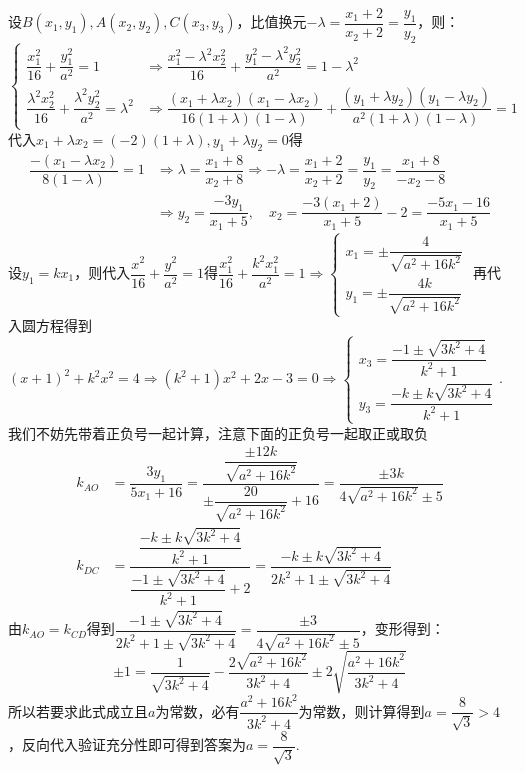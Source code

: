 \begin{solution}
    设$B(x_1,y_1),A(x_2,y_2),C(x_3,y_3)$，比值换元$-\lambda=\dfrac{x_1+2}{x_2+2}=\dfrac{y_1}{y_2}$，则：
    \[\begin{cases}\dfrac{x_1^2}{16}+\dfrac{y_1^2}{a^2}=1&\Rightarrow \dfrac{x_1^2-\lambda^2x_2^2}{16}+\dfrac{y_1^2-\lambda^2y_2^2}{a^2}=1-\lambda^2\\[1.2ex]\dfrac{\lambda^2x_2^2}{16}+\dfrac{\lambda^2y_2^2}{a^2}=\lambda^2&\Rightarrow \dfrac{(x_1+\lambda x_2)(x_1-\lambda x_2)}{16(1+\lambda)(1-\lambda)}+\dfrac{(y_1+\lambda y_2)(y_1-\lambda y_2)}{a^2(1+\lambda)(1-\lambda)}=1\end{cases}\]
    代入$x_1+\lambda x_2=(-2)(1+\lambda),y_1+\lambda y_2=0$得
    \begin{align*}\dfrac{-(x_1-\lambda x_2)}{8(1-\lambda)}=1&\Rightarrow \lambda=\dfrac{x_1+8}{x_2+8}\Rightarrow -\lambda=\dfrac{x_1+2}{x_2+2}=\dfrac{y_1}{y_2}=\dfrac{x_1+8}{-x_2-8}\\
    &\Rightarrow y_2=\dfrac{-3y_1}{x_1+5},\quad x_2=\dfrac{-3(x_1+2)}{x_1+5}-2=\dfrac{-5x_1-16}{x_1+5}
\end{align*}
设$y_1=kx_1$，则代入$\dfrac{x^2}{16}+\dfrac{y^2}{a^2}=1$得$\dfrac{x_1^2}{16}+\dfrac{k^2x_1^2}{a^2}=1\Rightarrow \begin{cases}x_1=\pm\dfrac{4}{\sqrt{a^2+16k^2}}\\[1.2ex]y_1=\pm\dfrac{4k}{\sqrt{a^2+16k^2}}\end{cases}$\newline
再代入圆方程得到$(x+1)^2+k^2x^2=4\Rightarrow (k^2+1)x^2+2x-3=0\Rightarrow \begin{cases}x_3=\dfrac{-1\pm\sqrt{3k^2+4}}{k^2+1}\\y_3=\dfrac{-k\pm k\sqrt{3k^2+4}}{k^2+1}\end{cases}$.\newline
我们不妨先带着正负号一起计算，注意下面的正负号一起取正或取负
\begin{align*}
    k_{AO}&=\dfrac{3y_1}{5x_1+16}=\dfrac{\dfrac{\pm 12k}{\sqrt{a^2+16k^2}}}{\pm\dfrac{20}{\sqrt{a^2+16k^2}}+16}=\dfrac{\pm 3k}{4\sqrt{a^2+16k^2}\pm 5}\\[1.2ex]
    k_{DC}&=\dfrac{\dfrac{-k\pm k\sqrt{3k^2+4}}{k^2+1}}{\dfrac{-1\pm\sqrt{3k^2+4}}{k^2+1}+2}=\dfrac{-k\pm k\sqrt{3k^2+4}}{2k^2+1\pm \sqrt{3k^2+4}}
\end{align*}
由$k_{AO}=k_{CD}$得到$\dfrac{-1\pm \sqrt{3k^2+4}}{2k^2+1\pm \sqrt{3k^2+4}}=\dfrac{\pm 3}{4\sqrt{a^2+16k^2}\pm 5}$，变形得到：
\[\pm 1=\dfrac{1}{\sqrt{3k^2+4}}-\dfrac{2\sqrt{a^2+16k^2}}{3k^2+4}\pm 2\sqrt{\dfrac{a^2+16k^2}{3k^2+4}}\]
所以若要求此式成立且$a$为常数，必有$\dfrac{a^2+16k^2}{3k^2+4}$为常数，则计算得到$a=\dfrac{8}{\sqrt{3}}>4$，反向代入验证充分性即可得到答案为$a=\dfrac{8}{\sqrt{3}}$.
\end{solution}
